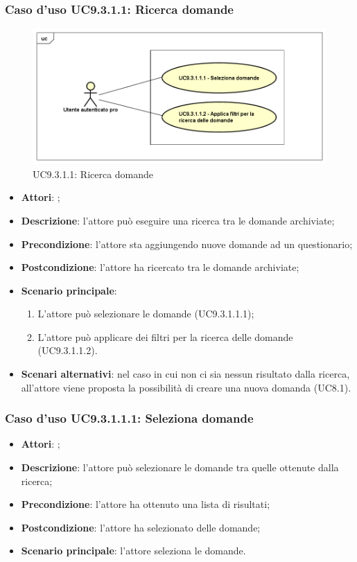 		 \subsubsection{Caso d'uso UC9.3.1.1: Ricerca domande}
		 \label{UC9.3.1.1}
		 \begin{figure}[h]
		 	\centering
		 	\includegraphics[scale=0.5,keepaspectratio]{UML/UC9_3_1_1.png}
		 	\caption{UC9.3.1.1: Ricerca domande}
		 \end{figure}
		 \FloatBarrier
		 \begin{itemize}
		 	\item \textbf{Attori}: \uaupro{};
		 	\item \textbf{Descrizione}: l'attore può eseguire una ricerca tra le domande archiviate; 
		 	\item \textbf{Precondizione}: l'attore sta aggiungendo nuove domande ad un questionario;
		 	\item \textbf{Postcondizione}: l'attore ha ricercato tra le domande archiviate;
		 	\item \textbf{Scenario principale}:
		 	\begin{enumerate}
		 		\item L'attore può selezionare le domande (UC9.3.1.1.1); 
		 		\item L'attore può applicare dei filtri per la ricerca delle domande (UC9.3.1.1.2).
		 	\end{enumerate}
		 	\item \textbf{Scenari alternativi}: nel caso in cui non ci sia nessun risultato dalla ricerca, all'attore viene proposta la possibilità di creare una nuova domanda (UC8.1).
		 \end{itemize}
		 
		 \subsubsection{Caso d'uso UC9.3.1.1.1: Seleziona domande}
		 \label{UC9.3.1.1.1}
		 \begin{itemize}
		 	\item \textbf{Attori}: \uaupro{};
		 	\item \textbf{Descrizione}: l'attore può selezionare le domande tra quelle ottenute dalla ricerca;
		 	\item \textbf{Precondizione}: l'attore ha ottenuto una lista di risultati;
		 	\item \textbf{Postcondizione}: l'attore ha selezionato delle domande; 
		 	\item \textbf{Scenario principale}: l'attore seleziona le domande.
		 \end{itemize}
		 
